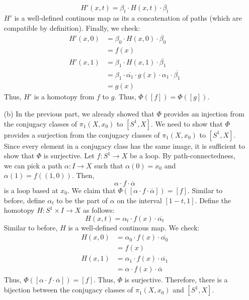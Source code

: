 \documentclass[12pt]{article}
\begin{document}
\begin{solution}
\begin{itemize}
        \[H'(x, t) = \beta_t \cdot H(x, t) \cdot \overline{\beta_t }\]
        $H'$ is a well-defined continous map as its a concatenation of paths (which are compatible by definition). Finally, we check: 
        \begin{align*}
            H'(x, 0) &= \beta_0 \cdot H(x, 0) \cdot \overline{\beta_0} \\
            &= f(x) \\
            H'(x, 1) &= \beta_1 \cdot H(x, 1) \cdot \overline{\beta_1} \\
            &= \beta_1 \cdot \overline{\alpha_1 } \cdot g(x) \cdot \alpha_1 \cdot \overline{\beta_1}\\
            &= g(x)
        \end{align*}
        Thus, $H'$ is a homotopy from $f$ to $g$. Thus, $\Phi([f]) = \Phi([g])$.
        \item[(b)] In the previous part, we already showed that $\Phi$ provides an injection from the conjugacy classes of $\pi_1(X, x_0)$ to $[S^1, X]$. We need to show that $\Phi$ provides a surjection from the conjugacy classes of $\pi_1(X, x_0)$ to $[S^1, X]$. Since every element in a conjugacy class has the same image, it is sufficient to show that $\Phi$ is surjective. \bbni
        Let $f: S^1 \to X$ be a loop. By path-connectedness, we can pick a path $\alpha: I \to X$ such that $\alpha(0) = x_0$ and $\alpha(1) = f((1,0))$. Then, 
        \[\alpha \cdot f \cdot \overline{\alpha} \]
        is a loop based at $x_0$. We claim that $\Phi([\alpha \cdot f \cdot \overline{\alpha}]) = [f]$. Similar to before, define $\alpha_t$ to be the part of $\alpha$ on the interval $[1-t, 1]$. Define the homotopy $H: S^1 \times I \to X$ as follows:
        \[ H(x, t) = \alpha_t \cdot f(x) \cdot \overline{\alpha_t} \]
        Similar to before, $H$ is a well-defined continous map. We check: 
        \begin{align*}
            H(x, 0) &= \alpha_0 \cdot f(x) \cdot \overline{\alpha_0} \\
            &= f(x) \\
            H(x, 1) &= \alpha_1 \cdot f(x) \cdot \overline{\alpha_1} \\
            &= \alpha \cdot f(x) \cdot \overline{\alpha}
        \end{align*}
        Thus, $\Phi([\alpha \cdot f \cdot \overline{\alpha}]) = [f]$. Thus, $\Phi$ is surjective. Therefore, there is a bijection between the conjugacy classes of $\pi_1(X, x_0)$ and $[S^1, X]$.
    \end{itemize}
\end{solution}
\newpage
\end{document}
